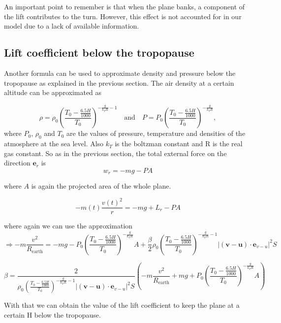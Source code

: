 \documentclass{article}
\renewcommand{\vec}[1]{\boldsymbol{#1}}
\begin{document}
An important point to remember is that when the plane banks, a component of the lift contributes to the turn. However, this effect is not accounted for in our model due to a lack of available information.

\subsection{Lift coefficient below the tropopause}

Another formula can be used to approximate density and pressure below the tropopause as explained in the previous section. The air density at a certain altitude can be approximated as \cite{nuic2004bada}

\begin{equation}
    \rho= \rho_0 \left(\frac{T_0-\frac{6.5H}{1000}}{T_0}\right)^{-\frac{g}{k_TR}-1} \quad \text{and} \quad P=P_0\left(\frac{T_0-\frac{6.5H}{1000}}{T_0}\right)^{-\frac{g}{k_TR}},
\end{equation} 
where $P_0$, $\rho_0$ and $T_0$ are the values of pressure, temperature and densities of the atmosphere at the sea level. Also $k_T$ is the boltzman constant and R is the real gas constant.
So as in the previous section, the total external force on the direction $\vec{e}_r$ is 
\begin{equation}
    w_r=-mg -PA 
\end{equation}

where $A$ is again the projected area of the whole plane.

\begin{equation}
    -m(t)\frac{v(t)^2}{r}=-mg+ L_r -PA
\end{equation}

where again we can use the approximation
\begin{equation}
  \Rightarrow  -m\frac{v^2}{R_{\text{earth}}}= -mg- P_0\left(\frac{T_0-\frac{6.5H}{1000}}{T_0}\right)^{-\frac{g}{k_TR}}A +\frac{\beta }{2}\rho_0 \left(\frac{T_0-\frac{6.5H}{1000}}{T_0}\right)^{-\frac{g}{k_TR}-1} |(\vec{v}-\vec{u})\cdot \vec e_{v-u}|^2S
\end{equation}

\begin{equation}
\beta= \frac{2}{\rho_0 \left(\frac{T_0-\frac{6.5H}{1000}}{T_0}\right)^{-\frac{g}{k_TR}-1} |(\vec{v}-\vec{u})\cdot \vec e_{v-u}|^2S} \left(-m\frac{v^2}{R_{\text{earth}}} + mg+ P_0\left(\frac{T_0-\frac{6.5H}{1000}}{T_0}\right)^{-\frac{g}{k_TR}}A \right)
\end{equation}

With that we can obtain the value of the lift coefficient to keep the plane at a certain H below the tropopause.
\printbibliography
\end{document}
